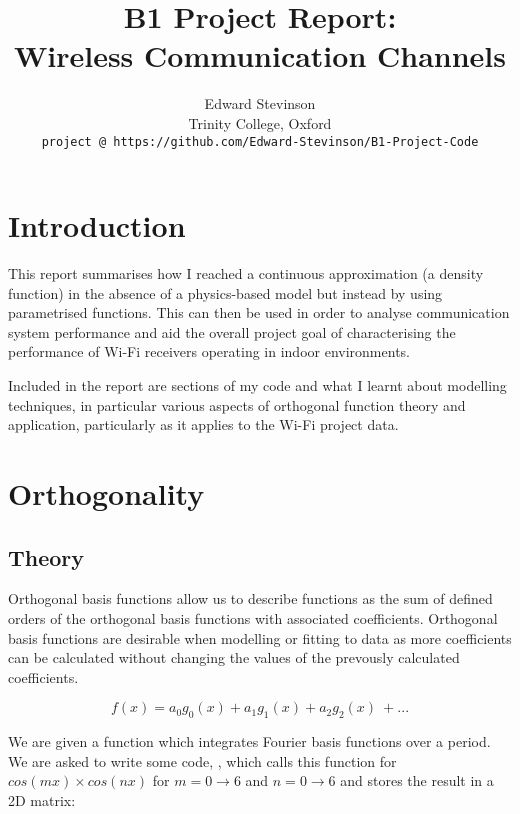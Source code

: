 \documentclass{article}
\begin{document}
\thispagestyle{empty}
\title{B1 Project Report: \\
Wireless Communication Channels}
\author{Edward Stevinson \\
    Trinity College, Oxford \\
    \texttt{project @ https://github.com/Edward-Stevinson/B1-Project-Code}}
\maketitle    



\section{Introduction}

This report summarises how I reached a continuous approximation (a density function) in the absence of a physics-based model but instead by using parametrised functions. This can then be used in order to analyse communication system performance and aid the overall project goal of characterising the performance of Wi-Fi receivers operating in indoor environments.

Included in the report are sections of my code and what I learnt about modelling techniques, in particular various aspects of orthogonal function theory and application, particularly as it applies to the Wi-Fi project data. 

\section{Orthogonality}

\subsection{Theory}

Orthogonal basis functions allow us to describe functions as the sum of defined orders of the orthogonal basis functions with associated coefficients. Orthogonal basis functions are desirable when modelling or fitting to data as more coefficients can be calculated without changing the values of the prevously calculated coefficients.

\begin{equation}
f(x) = a_0g_0(x) + a_1g_1(x) + a_2g_2(x) \ + ...
\end{equation}

We are given a function  which integrates Fourier basis functions over a period. We are asked to write some code, , which calls this function for $cos(m x) \times{cos(n x)}$ for $m = 0 \rightarrow{6} $ and $n = 0 \rightarrow{6}$ and stores the result in a 2D matrix: 
\end{document}
